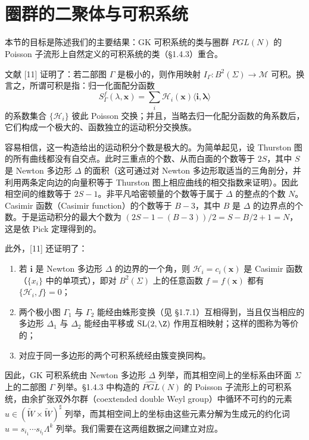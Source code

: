 \section{圈群的二聚体与可积系统}

本节的目标是陈述我们的主要结果：GK 可积系统的类与圈群 $\widehat{PGL}(N)$ 的 Poisson 子流形上自然定义的可积系统的类（§1.4.3）重合。

文献 [11] 证明了：若二部图 $\Gamma$ 是极小的，则作用映射 $I_\Gamma:B^2(\Sigma)\to\mathcal{M}$ 可积。换言之，所谓可积是指：归一化面配分函数
\[
S^f_\Gamma(\lambda,\boldsymbol{x})=\sum_i\mathcal{H}_i(\boldsymbol{x})\langle\boldsymbol{i},\boldsymbol{\lambda}\rangle
\]
的系数集合 $\{\mathcal{H}_i\}$ 彼此 Poisson 交换；并且，当略去归一化配分函数的角系数后，它们构成一个极大的、函数独立的运动积分交换族。

容易相信，这一构造给出的运动积分个数是极大的。为简单起见，设 Thurston 图的所有曲线都没有自交点。此时三重点的个数、从而白面的个数等于 $2S$，其中 $S$ 是 Newton 多边形 $\Delta$ 的面积（这可通过对 Newton 多边形取适当的三角剖分，并利用两条定向边的向量积等于 Thurston 图上相应曲线的相交指数来证明）。因此相空间的维数等于 $2S-1$。非平凡哈密顿量的个数等于属于 $\Delta$ 的整点的个数 $N$。Casimir 函数（Casimir function）的个数等于 $B-3$，其中 $B$ 是 $\Delta$ 的边界点的个数。于是运动积分的最大个数为 $(2S-1-(B-3))/2=S-B/2+1=N$，这是依 Pick 定理得到的。

此外，[11] 还证明了：

\begin{enumerate}[label=(\roman*),leftmargin=3em]
\item 若 $\boldsymbol{i}$ 是 Newton 多边形 $\Delta$ 的边界的一个角，则 $\mathcal{H}_i=c_i(\boldsymbol{x})$ 是 Casimir 函数（$\{x_i\}$ 中的单项式），即对 $B^2(\Sigma)$ 上的任意函数 $f=f(\boldsymbol{x})$ 都有 $\{\mathcal{H}_i,f\}=0$；
\item 两个极小图 $\Gamma_1$ 与 $\Gamma_2$ 能经由蛛形变换（见 §1.7.1）互相得到，当且仅当相应的多边形 $\Delta_1$ 与 $\Delta_2$ 能经由平移或 $\mathrm{SL}(2,\Z)$ 作用互相映射；这样的图称为等价的；
\item 对应于同一多边形的两个可积系统经由簇变换同构。
\end{enumerate}

因此，GK 可积系统由 Newton 多边形 $\Delta$ 列举，而其相空间上的坐标系由环面 $\Sigma$ 上的二部图 $\Gamma$ 列举。§1.4.3 中构造的 $\widehat{PGL}(N)$ 的 Poisson 子流形上的可积系统，由余扩张双外尔群（coextended double Weyl group）中循环不可约的元素 $u\in(\tilde W\times\tilde W)^{\sharp}$ 列举，而其相空间上的坐标由这些元素分解为生成元的约化词 $u=s_{i_1}\cdots s_{i_l}\Lambda^k$ 列举。我们需要在这两组数据之间建立对应。


